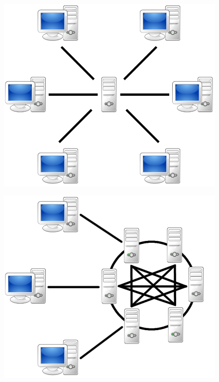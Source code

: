 \begin{figure}
	\centering
	\begin{minipage}{.33\textwidth}
		\centering
		\includegraphics[scale=0.175]{Talk5/1st_gen_dfs.PNG}
		\label{1st_gen_dfs}
	\end{minipage}%
	\begin{minipage}{.33\textwidth}
		\centering
		\includegraphics[scale=0.175]{Talk5/2nd_gen_dfs.PNG}

\end{minipage}
\end{figure}
